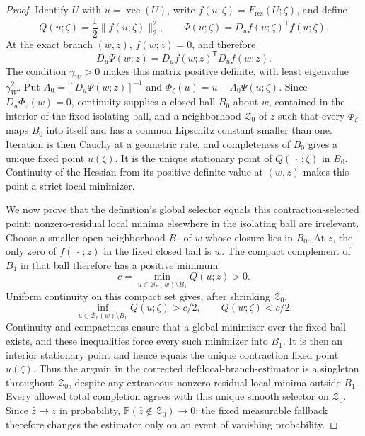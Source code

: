 \documentclass{article}
\begin{document}
\begin{proof}
Identify \(U\) with \(u=\operatorname{vec}(U)\), write \(f(u;\zeta)=F_{\mathrm{res}}(U;\zeta)\), and define
\[
 Q(u;\zeta)=\frac12\lVert f(u;\zeta)\rVert_2^2,
 \qquad \Psi(u;\zeta)=D_uf(u;\zeta)^{\mathsf T}f(u;\zeta).
\]
At the exact branch \((w,z)\), \(f(w;z)=0\), and therefore
\[
 D_u\Psi(w;z)=D_uf(w;z)^{\mathsf T}D_uf(w;z).
\]
The condition \(\gamma_W>0\) makes this matrix positive definite, with least eigenvalue \(\gamma_W^2\).  Put \(A_0=[D_u\Psi(w;z)]^{-1}\) and \(\Phi_\zeta(u)=u-A_0\Psi(u;\zeta)\).  Since \(D_u\Phi_z(w)=0\), continuity supplies a closed ball \(B_0\) about \(w\), contained in the interior of the fixed isolating ball, and a neighborhood \(\mathcal Z_0\) of \(z\) such that every \(\Phi_\zeta\) maps \(B_0\) into itself and has a common Lipschitz constant smaller than one.  Iteration is then Cauchy at a geometric rate, and completeness of \(B_0\) gives a unique fixed point \(u(\zeta)\).  It is the unique stationary point of \(Q(\,\cdot\,;\zeta)\) in \(B_0\).  Continuity of the Hessian from its positive-definite value at \((w,z)\) makes this point a strict local minimizer.

We now prove that the definition's global selector equals this contraction-selected point; nonzero-residual local minima elsewhere in the isolating ball are irrelevant.  Choose a smaller open neighborhood \(B_1\) of \(w\) whose closure lies in \(B_0\).  At \(z\), the only zero of \(f(\,\cdot\,;z)\) in the fixed closed ball is \(w\).  The compact complement of \(B_1\) in that ball therefore has a positive minimum
\[
 c=\min_{u\in\mathcal B_r(w)\setminus B_1}Q(u;z)>0.
\]
Uniform continuity on this compact set gives, after shrinking \(\mathcal Z_0\),
\[
 \inf_{u\in\mathcal B_r(w)\setminus B_1}Q(u;\zeta)>c/2,
 \qquad Q(w;\zeta)<c/2.
\]
Continuity and compactness ensure that a global minimizer over the fixed ball exists, and these inequalities force every such minimizer into \(B_1\).  It is then an interior stationary point and hence equals the unique contraction fixed point \(u(\zeta)\).  Thus the argmin in the corrected \(\text{def:local-branch-estimator}\) is a singleton throughout \(\mathcal Z_0\), despite any extraneous nonzero-residual local minima outside \(B_1\). Every allowed total completion agrees with this unique smooth selector on \(\mathcal Z_0\). Since \(\widehat z\to z\) in probability, \(\mathbb P(\widehat z\notin\mathcal Z_0)\to0\); the fixed measurable fallback therefore changes the estimator only on an event of vanishing probability.


\end{proof}
\end{document}
